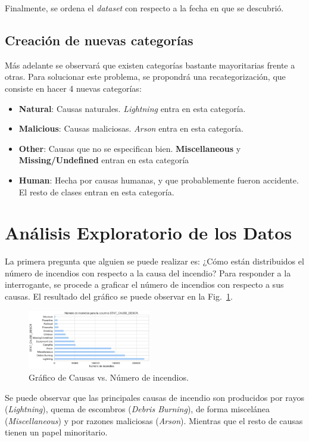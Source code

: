 Finalmente, se ordena el \textit{dataset} con respecto a la fecha en que se descubrió.

\subsection{Creación de nuevas categorías}\label{subsec:nuevas-cats}
Más adelante se observará que existen categorías bastante mayoritarias frente a otras. Para solucionar este problema, se propondrá una recategorización, que consiste en hacer 4 nuevas categorías:
\begin{itemize}
    \item \textbf{Natural}: Causas naturales. \textit{Lightning} entra en esta categoría.
    \item \textbf{Malicious}: Causas maliciosas. \textit{Arson} entra en esta categoría.
    \item \textbf{Other}: Causas que no se especifican bien. \textbf{Miscellaneous} y \textbf{Missing/Undefined} entran en esta categoría
    \item \textbf{Human}: Hecha por causas humanas, y que probablemente fueron accidente. El resto de clases entran en esta categoría.
\end{itemize}

\section{Análisis Exploratorio de los Datos}\label{EDA}
La primera pregunta que alguien se puede realizar es: ¿Cómo están distribuidos el número de incendios con respecto a la causa del incendio? Para responder a la interrogante, se procede a graficar el número de incendios con respecto a sus causas. El resultado del gráfico se puede observar en la Fig.~\ref{fig:SCD}. 

\begin{figure}
    \centering
    \includegraphics[width=0.48\textwidth]{imagenes/barh_STAT_CAUSE_DESCR.pdf}
    \caption{Gráfico de Causas vs. Número de incendios.}
    \label{fig:SCD}
\end{figure}

Se puede observar que las principales causas de incendio son producidos por rayos (\textit{Lightning}), quema de escombros (\textit{Debris Burning}), de forma miscelánea (\textit{Miscellaneous}) y por razones maliciosas (\textit{Arson}). Mientras que el resto de causas tienen un papel minoritario. 

